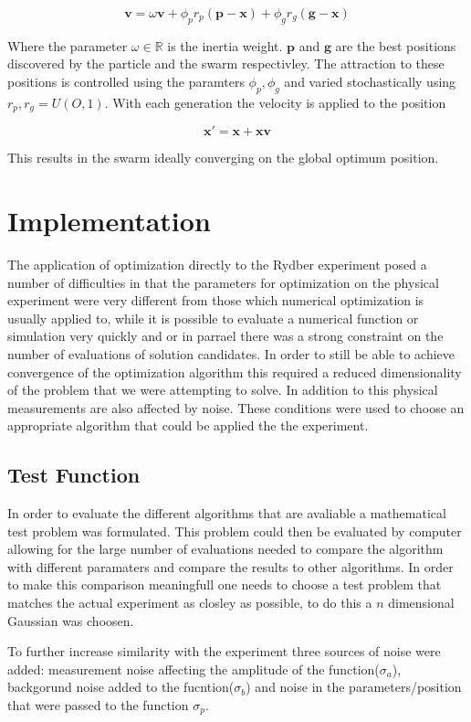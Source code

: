 \documentclass[a4paper,titlepage]{report}
\begin{document}
\[ \mathbf{v} = \omega \mathbf{v} + \phi_p r_p (\mathbf{p} - \mathbf{x}) + \phi_g r_g (\mathbf{g} - \mathbf{x}) \]

Where the parameter $\omega \in \mathbb{R}$ is the inertia weight. $\mathbf{p}$ and $\mathbf{g}$ are the best positions discovered by the particle and the swarm respectivley. The attraction to these positions is controlled using the paramters $\phi_p, \phi_g$ and varied stochastically using $r_p,r_g = U(O,1)$. With each generation the velocity is applied to the position

\[\mathbf{x}' = \mathbf{x} + \mathbf{x} \mathbf{v} \]

This results in the swarm ideally converging on the global optimum position.




\chapter{Implementation}

The application of optimization directly to the Rydber experiment posed a number of difficulties in that the parameters for optimization on the physical experiment were very different from those which numerical optimization is usually applied to, while it is possible to evaluate a numerical function or simulation very quickly and or in parrael there was a strong constraint on the number of evaluations of solution candidates. In order to still be able to achieve convergence of the optimization algorithm this required a reduced dimensionality of the problem that we were attempting to solve. In addition to this physical measurements are also affected by noise. These conditions were used to choose an appropriate algorithm that could be applied the the experiment.

\section{Test Function}
In order to evaluate the different algorithms that are avaliable a mathematical test problem was formulated. This problem could then be evaluated by computer allowing for the large number of evaluations needed to compare the algorithm with different paramaters and compare the results to other algorithms. In order to make this comparison meaningfull one needs to choose a test problem that matches the actual experiment as closley as possible, to do this a $n$ dimensional Gaussian was choosen.

To further increase similarity with the experiment three sources of noise were added: measurement noise affecting the amplitude of the function($\sigma_a$), backgorund noise added to the fucntion($\sigma_b$) and noise in the parameters/position that were passed to the function $\sigma_p$. 
\end{document}
